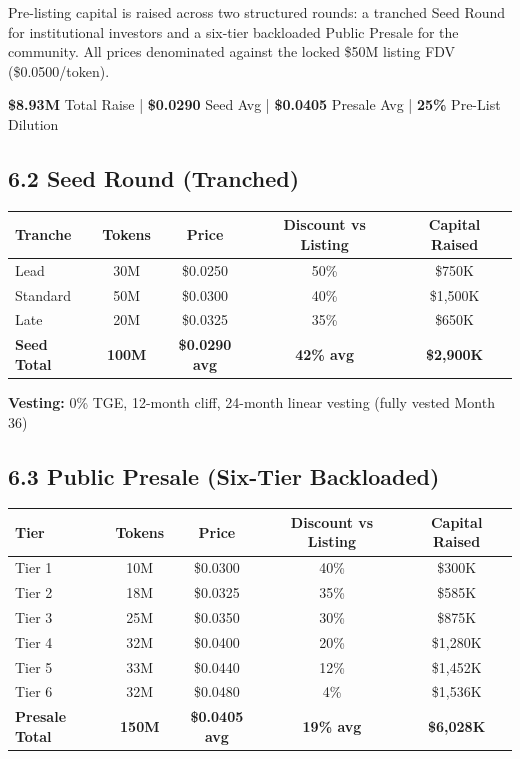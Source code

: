 \documentclass[
  paper=a4,
  ,captions=tableheading
]{scrartcl}
\begin{document}
Pre-listing capital is raised across two structured rounds: a tranched Seed Round for institutional investors and a six-tier backloaded Public Presale for the community. All prices denominated against the locked \$50M listing FDV (\$0.0500/token).

\begin{center}
\textbf{\$8.93M} Total Raise \quad | \quad \textbf{\$0.0290} Seed Avg \quad | \quad \textbf{\$0.0405} Presale Avg \quad | \quad \textbf{25\%} Pre-List Dilution
\end{center}

\subsection{6.2 Seed Round (Tranched)}\label{seed-round-tranched}

\begin{center}
\begin{tabular}{lcccc}
\toprule
\textbf{Tranche} & \textbf{Tokens} & \textbf{Price} & \textbf{Discount vs Listing} & \textbf{Capital Raised} \\
\midrule
Lead & 30M & \$0.0250 & 50\% & \$750K \\
Standard & 50M & \$0.0300 & 40\% & \$1,500K \\
Late & 20M & \$0.0325 & 35\% & \$650K \\
\midrule
\textbf{Seed Total} & \textbf{100M} & \textbf{\$0.0290 avg} & \textbf{42\% avg} & \textbf{\$2,900K} \\
\bottomrule
\end{tabular}
\end{center}

\textbf{Vesting:} 0\% TGE, 12-month cliff, 24-month linear vesting (fully vested Month 36)

\subsection{6.3 Public Presale (Six-Tier Backloaded)}\label{public-presale-six-tier}

\begin{center}
\begin{tabular}{lcccc}
\toprule
\textbf{Tier} & \textbf{Tokens} & \textbf{Price} & \textbf{Discount vs Listing} & \textbf{Capital Raised} \\
\midrule
Tier 1 & 10M & \$0.0300 & 40\% & \$300K \\
Tier 2 & 18M & \$0.0325 & 35\% & \$585K \\
Tier 3 & 25M & \$0.0350 & 30\% & \$875K \\
Tier 4 & 32M & \$0.0400 & 20\% & \$1,280K \\
Tier 5 & 33M & \$0.0440 & 12\% & \$1,452K \\
Tier 6 & 32M & \$0.0480 & 4\% & \$1,536K \\
\midrule
\textbf{Presale Total} & \textbf{150M} & \textbf{\$0.0405 avg} & \textbf{19\% avg} & \textbf{\$6,028K} \\
\bottomrule
\end{tabular}
\end{center}
\end{document}
